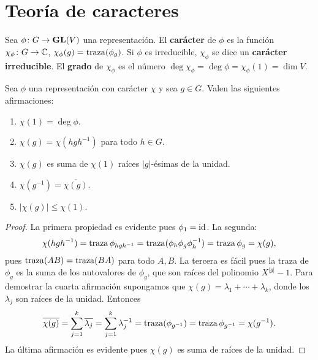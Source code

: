\chapter{Teoría de caracteres}

\begin{definition}
  Sea $\phi\colon G\to\mathbf{GL}(V)$ una representación. El \textbf{carácter} de
  $\phi$ es la función $\chi_\phi\colon G\to\mathbb{C}$, $\chi_\phi(g)=\operatorname{traza}(\phi_g)$.
  Si $\phi$ es irreducible, $\chi_\phi$ se dice un \textbf{carácter
  irreducible}. El \textbf{grado} de $\chi_{\phi}$ es el número
  $\deg\chi_\phi=\deg\phi=\chi_{\phi}(1)=\dim V$. 
\end{definition}

\begin{proposition}
  \label{pro:chi(1)}
  Sea $\phi$ una representación con carácter $\chi$ y sea $g\in G$.
  Valen las siguientes afirmaciones:
  \begin{enumerate}
    \item $\chi(1)=\deg\phi$. 
    \item $\chi(g)=\chi(hgh^{-1})$ para todo $h\in G$.
    \item $\chi(g)$ es suma de $\chi(1)$ raíces $|g|$-ésimas de la unidad.
    \item $\chi(g^{-1})=\overline{\chi(g)}$.
    \item $|\chi(g)|\leq\chi(1)$.
  \end{enumerate}
\end{proposition}

\begin{proof}
  La primera propiedad es evidente pues $\phi_1=\operatorname{id}$. La segunda:
  \begin{align*}
    \chi(hgh^{-1})=\operatorname{traza}\phi_{hgh^{-1}}=\operatorname{traza}(\phi_h\phi_g\phi_h^{-1})=\operatorname{traza}\phi_g=\chi(g),
  \end{align*}
  pues $\operatorname{traza}(AB)=\operatorname{traza}(BA)$ para todo $A,B$. La tercera es fácil pues
  la traza de $\phi_g$ es la suma de los autovalores de $\phi_g$, que son
  raíces del polinomio $X^{|g|}-1$. Para demostrar la cuarta afirmación
  supongamos que $\chi(g)=\lambda_1+\cdots+\lambda_k$, donde los $\lambda_j$
  son raíces de la unidad. Entonces 
  \[
    \overline{\chi(g)}
    =\sum_{j=1}^k\overline{\lambda_j}=\sum_{j=1}^k\lambda_j^{-1}=\operatorname{traza}(\phi_{g^{-1}})=\operatorname{traza}\phi_{g^{-1}}=\chi(g^{-1}).
  \]
  La última afirmación es evidente pues $\chi(g)$ es suma de raíces de la
  unidad.
\end{proof}


